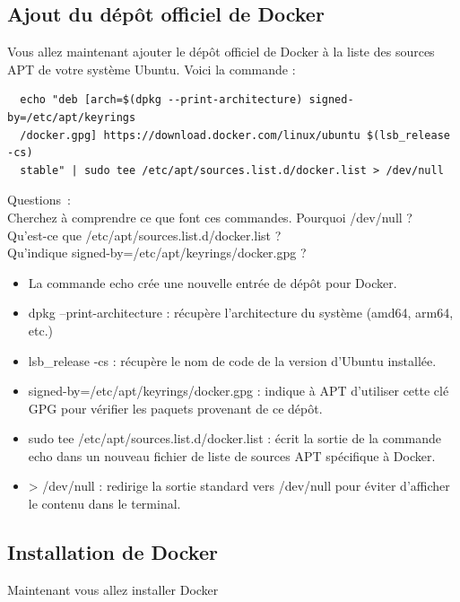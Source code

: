 \newpage

\subsection*{Ajout du dépôt officiel de Docker}
{}
\noindent Vous allez maintenant ajouter le dépôt officiel de Docker à la liste des sources APT de votre système Ubuntu. Voici la commande :

\begin{verbatim}
  echo "deb [arch=$(dpkg --print-architecture) signed-by=/etc/apt/keyrings
  /docker.gpg] https://download.docker.com/linux/ubuntu $(lsb_release -cs)
  stable" | sudo tee /etc/apt/sources.list.d/docker.list > /dev/null
\end{verbatim}

Questions~:\\
Cherchez à comprendre ce que font ces commandes. Pourquoi /dev/null ?\\
Qu'est-ce que /etc/apt/sources.list.d/docker.list ?\\
Qu'indique signed-by=/etc/apt/keyrings/docker.gpg ?\\

\begin{itemize}
  \item La commande echo crée une nouvelle entrée de dépôt pour Docker.
  \item dpkg --print-architecture : récupère l'architecture du système (amd64, arm64, etc.)
  \item lsb\_release -cs : récupère le nom de code de la version d'Ubuntu installée.
  \item signed-by=/etc/apt/keyrings/docker.gpg : indique à APT d'utiliser cette clé GPG pour vérifier les paquets provenant de ce dépôt.
  \item sudo tee /etc/apt/sources.list.d/docker.list : écrit la sortie de la commande echo dans un nouveau fichier de liste de sources APT spécifique à Docker.
  \item > /dev/null : redirige la sortie standard vers /dev/null pour éviter d'afficher le contenu dans le terminal.
\end{itemize}

\subsection*{Installation de Docker}
{}
\noindent Maintenant vous allez installer Docker

